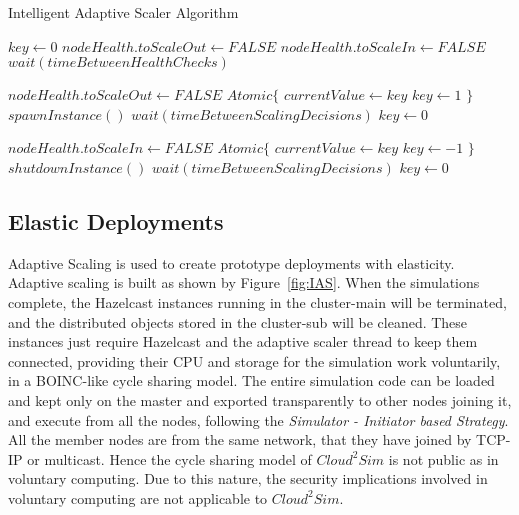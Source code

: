\begin{algorithm}[h]
  \caption{Intelligent Adaptive Scaler Algorithm}
\label{alg:ias}
  \begin{algorithmic}
 
\State $key \gets 0$
\State $nodeHealth.toScaleOut \gets FALSE$
\EndIf
{}
\State $nodeHealth.toScaleIn \gets FALSE$
\EndIf
\EndProcedure
\Statex
{}
\State $wait(timeBetweenHealthChecks)$

\State $nodeHealth.toScaleOut \gets FALSE$ 
\State $Atomic\{$ 
\State $currentValue \gets key$
\State $key \gets 1$
\State$\}$
 
\State $spawnInstance()$
\State $wait(timeBetweenScalingDecisions)$
\State $key \gets 0$ 
\EndIf
\EndIf

\State $nodeHealth.toScaleIn \gets FALSE$
\State $Atomic\{$
\State $currentValue \gets key$
\State $key \gets -1$
\State$\}$
\State $shutdownInstance()$
\State $wait(timeBetweenScalingDecisions)$
\State $key \gets 0$
\EndIf
\EndIf



    \EndWhile  
\EndProcedure
  \end{algorithmic}
\end{algorithm}
 
\subsection{Elastic Deployments}
Adaptive Scaling is used to create prototype deployments with elasticity. Adaptive scaling is built as shown by Figure~\ref{fig:IAS}. When the simulations complete, the Hazelcast instances running in the cluster-main will be terminated, and the distributed objects stored in the cluster-sub will be cleaned. These instances just require Hazelcast and the adaptive scaler thread to keep them connected, providing their CPU and storage for the  simulation work voluntarily, in a BOINC-like cycle sharing model. The entire simulation code can be loaded and kept only on the master and exported transparently to other nodes joining it, and execute from all the nodes, following the \textit{Simulator - Initiator based Strategy}. All the member nodes are from the same network, that they have joined by TCP-IP or multicast. Hence the cycle sharing model of $Cloud^{2}Sim$ is not public as in voluntary computing. Due to this nature, the security implications involved in voluntary computing are not applicable to $Cloud^{2}Sim$.

